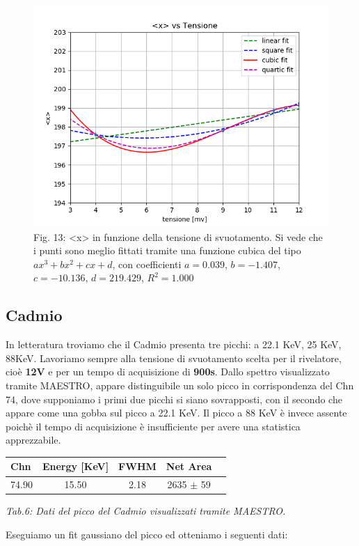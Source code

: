 \documentclass[a4paper]{article}
\begin{document}
\begin{figure}[!h]
\includegraphics[width=1\textwidth]{x_vs_Tensione}
        \caption{Fig. 13: <x> in funzione della tensione di svuotamento. Si vede che i punti sono meglio fittati tramite una funzione cubica del tipo $ax^3+bx^2+cx+d$, con coefficienti $a=0.039$, $b=-1.407$, $c=-10.136$, $d=219.429$, $R^2= 1.000$}
        \label{fig:13}
\end{figure}
\newpage

\subsection{Cadmio}
In letteratura troviamo che il Cadmio presenta tre picchi: a 22.1 KeV, 25 KeV, 88KeV. Lavoriamo sempre alla tensione di svuotamento scelta per il rivelatore, cioè \textbf{12V} e per un tempo di acquisizione di \textbf{900s}. Dallo spettro visualizzato tramite MAESTRO, appare distinguibile un solo picco in corrispondenza del Chn 74, dove supponiamo i primi due picchi si siano sovrapposti, con il secondo che appare come una gobba sul picco a 22.1 KeV. Il picco a 88 KeV è invece assente poichè il tempo di acquisizione è insufficiente per avere una statistica apprezzabile.  
\begin{center} 
		
		\begin{tabular}{lcccc}
			\hline
			\hline
			\textbf{Chn}      &     \textbf{Energy} [KeV]  &     \textbf{FWHM} &     \textbf{Net Area} 	 \\
			\hline
			\hline
				      74.90  &	15.50	&		2.18 		& 2635 $\pm$ 59			\\
				       
			\hline
			\hline
		\end{tabular}
		\linebreak
		\emph{Tab.6: Dati del picco del Cadmio visualizzati tramite MAESTRO.} 
	\end{center} 	
Eseguiamo un fit gaussiano del picco ed otteniamo i seguenti dati:
\end{document}

